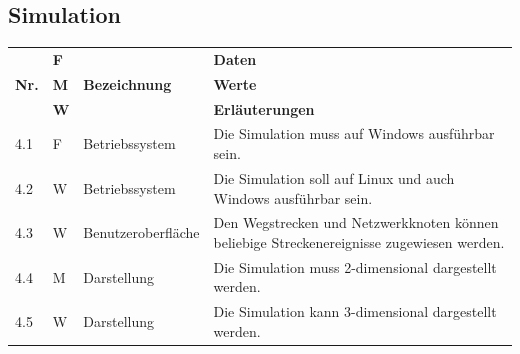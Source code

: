 \documentclass[../main.tex]{subfiles}
\begin{document}
\subsection{Simulation}
\begin{tabular}{|l|p{0.5cm}|p{4cm}|p{10cm}|}
  \hline
               & \textbf{F} &                           & \textbf{Daten}                                                                                                                                                                                     \\
  \textbf{Nr.} & \textbf{M} & \textbf{Bezeichnung}      & \textbf{Werte}                                                                                                                                                                                     \\
               & \textbf{W} &                           & \textbf{Erläuterungen}                                                                                                                                                                             \\
  \hline
  4.1          & F          & Betriebssystem            & Die Simulation muss auf Windows ausführbar sein.                                                                                                                                                   \\
  \hline
  4.2          & W          & Betriebssystem            & Die Simulation soll auf Linux und auch Windows ausführbar sein.                                                                                                                                    \\
  \hline
  4.3          & W          & Benutzeroberfläche        & Den Wegstrecken und Netzwerkknoten können beliebige Streckenereignisse zugewiesen werden.                                                                                                          \\
  \hline
  4.4          & M          & Darstellung               & Die Simulation muss 2-dimensional dargestellt werden.                                                                                                                                              \\
  \hline
  4.5          & W          & Darstellung               & Die Simulation kann 3-dimensional dargestellt werden.                                                                                                                                              \\

\end{tabular}
\end{document}
